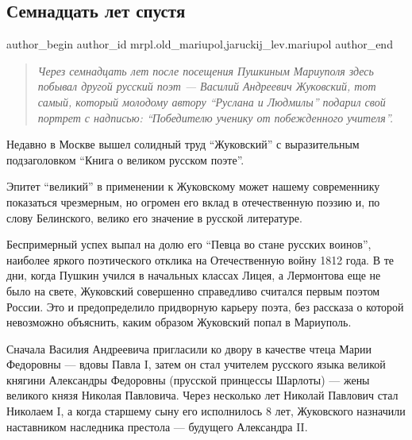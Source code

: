  
 
 
 
 
 
\subsection{Семнадцать лет спустя}
\label{sec:21_06_2011.stz.mrpl.old_mariupol.1.semnadcat_let_spustja}
 
\ifcmt
 author_begin
   author_id mrpl.old_mariupol,jaruckij_lev.mariupol
 author_end
\fi

\begin{quote}
\em Через семнадцать лет после посещения Пушкиным Мариуполя здесь побывал другой
русский поэт — Василий Андреевич Жуковский, тот самый, который молодому автору
\enquote{Руслана и Людмилы} подарил свой портрет с надписью: \enquote{Победителю ученику от
побежденного учителя}. 	
\end{quote}

Недавно в Москве вышел солидный труд \enquote{Жуковский} с выразительным
подзаголовком \enquote{Книга о великом русском поэте}.

Эпитет \enquote{великий} в применении к Жуковскому может нашему современнику
показаться чрезмерным, но огромен его вклад в отечественную поэзию и, по слову
Белинского, велико его значение в русской литературе.

Беспримерный успех выпал на долю его \enquote{Певца во стане русских воинов},
наиболее яркого поэтического отклика на Отечественную войну 1812 года. В те
дни, когда Пушкин учился в начальных классах Лицея, а Лермонтова еще не было на
свете, Жуковский совершенно справедливо считался первым поэтом России. Это и
предопределило придворную карьеру поэта, без рассказа о которой невозможно
объяснить, каким образом Жуковский попал в Мариуполь.

Сначала Василия Андреевича пригласили ко двору в качестве чтеца Марии Федоровны
— вдовы Павла I, затем он стал учителем русского языка великой княгини
Александры Фе­доровны (прусской принцессы Шарлоты) — жены великого князя
Николая Павловича. Через несколько лет Николай Павлович стал Николаем I, а
когда старшему сыну его исполнилось 8 лет, Жуковского назначили наставником
наследника престола — будущего Александра II.

